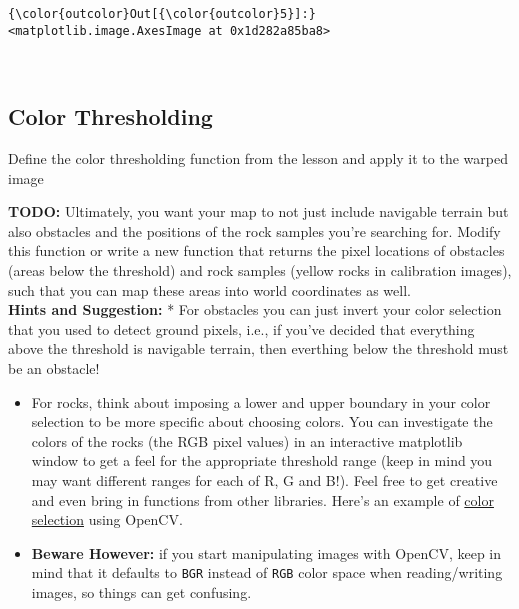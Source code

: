 \documentclass[11pt]{article}
\begin{document}
\begin{Verbatim}[commandchars=\\\{\}]
{\color{outcolor}Out[{\color{outcolor}5}]:} <matplotlib.image.AxesImage at 0x1d282a85ba8>
\end{Verbatim}
            
    \begin{center}
    \end{center}
    { \hspace*{\fill} \\}
    
    \subsection{Color Thresholding}\label{color-thresholding}

Define the color thresholding function from the lesson and apply it to
the warped image

\textbf{TODO:} Ultimately, you want your map to not just include
navigable terrain but also obstacles and the positions of the rock
samples you're searching for. Modify this function or write a new
function that returns the pixel locations of obstacles (areas below the
threshold) and rock samples (yellow rocks in calibration images), such
that you can map these areas into world coordinates as well.\\
\textbf{Hints and Suggestion:} * For obstacles you can just invert your
color selection that you used to detect ground pixels, i.e., if you've
decided that everything above the threshold is navigable terrain, then
everthing below the threshold must be an obstacle!

\begin{itemize}
\item
  For rocks, think about imposing a lower and upper boundary in your
  color selection to be more specific about choosing colors. You can
  investigate the colors of the rocks (the RGB pixel values) in an
  interactive matplotlib window to get a feel for the appropriate
  threshold range (keep in mind you may want different ranges for each
  of R, G and B!). Feel free to get creative and even bring in functions
  from other libraries. Here's an example of
  \href{http://opencv-python-tutroals.readthedocs.io/en/latest/py_tutorials/py_imgproc/py_colorspaces/py_colorspaces.html}{color
  selection} using OpenCV.
\item
  \textbf{Beware However:} if you start manipulating images with OpenCV,
  keep in mind that it defaults to \texttt{BGR} instead of \texttt{RGB}
  color space when reading/writing images, so things can get confusing.
\end{itemize}
\end{document}
